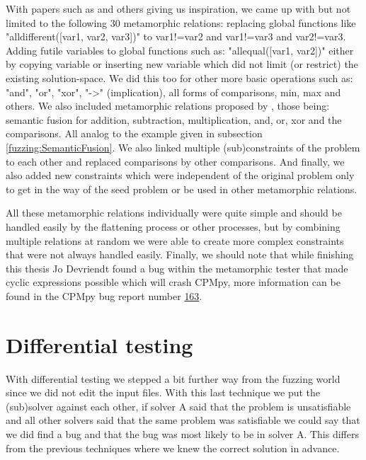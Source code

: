 With papers such as \cite{50akgun2018metamorphic, 49usman2020testmc, 43YinYang} and others giving us inspiration, we came up with but not limited to the following 30 metamorphic relations: replacing global functions like "alldifferent([var1, var2, var3])" to var1!=var2 and var1!=var3 and var2!=var3. Adding futile variables to global functions such as: "allequal([var1, var2])" either by copying variable or inserting new variable which did not limit (or restrict) the existing solution-space. We did this too for other more basic operations such as: "and", "or", "xor", "->" (implication), all forms of comparisons, min, max and others. We also included metamorphic relations proposed by \cite{43YinYang}, those being: semantic fusion for addition, subtraction, multiplication, and, or, xor and the comparisons. All analog to the example given in subsection \ref{fuzzing:SemanticFusion}. We also linked multiple (sub)constraints of the problem to each other and replaced comparisons by other comparisons. And finally, we also added new constraints which were independent of the original problem only to get in the way of the seed problem or be used in other metamorphic relations.

All these metamorphic relations individually were quite simple and should be handled easily by the flattening process or other processes, but by combining multiple relations at random we were able to create more complex constraints that were not always handled easily. Finally, we should note that while finishing this thesis Jo Devriendt found a bug within the metamorphic tester that made cyclic expressions possible which will crash CPMpy, more information can be found in the CPMpy bug report number \href{https://github.com/CPMpy/cpmpy/issues/163}{163}.

\section{Differential testing}
\label{impl:diff}
With differential testing we stepped a bit further way from the fuzzing world since we did not edit the input files.
With this last technique we put the (sub)solver against each other, if solver A said that the problem is unsatisfiable and all other solvers said that the same problem was satisfiable we could say that we did find a bug and that the bug was most likely to be in solver A. This differs from the previous techniques where we knew the correct solution in advance.



